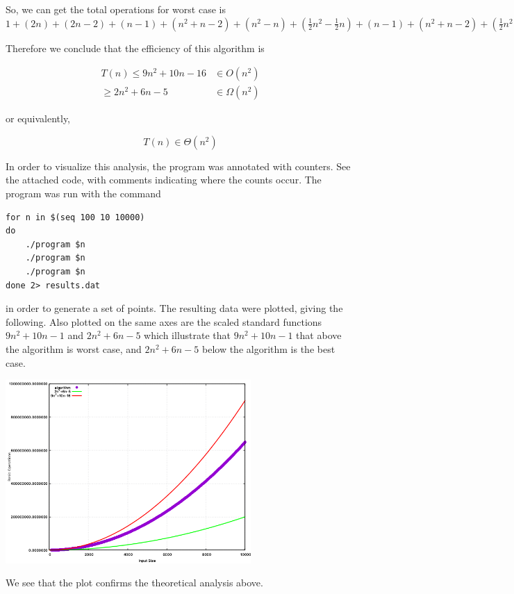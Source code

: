 \documentclass[11pt]{article}
\begin{document}
So, we can get the total operations for worst case is 
     $1  
      + (2n) 
      + (2n - 2) 
      + (n - 1) 
      + (n^{2} + n - 2) 
      + (n^{2} - n) 
      + (\frac{1}{2}n^{2} - \frac{1}{2}n) 
      + (n - 1) 
      + (n^{2} + n - 2) 
      + (\frac{1}{2}n^{2} - \frac{1}{2}n) 
      + (2n -2) 
      + (\frac{1}{2}n^{2} + \frac{1}{2}n - 1)
      + (\frac{1}{2}n^{2} - \frac{1}{2}n)
      + (n^{2} + n - 2)
      + (n^{2} - n)
      + (\frac{1}{2}n^{2} - \frac{1}{2}n) 
      + (n^{2} + n - 2)
      + (\frac{1}{2}n^{2} - \frac{1}{2}n)
      + (2n -2) = 9n^{2} + 10n - 16$

Therefore we conclude that the efficiency of this algorithm is

\begin{align*}
  T(n) \leq 9n^{2} + 10n - 16 &\in O(n^{2})\\
       \geq 2n^{2} + 6n - 5 &\in \Omega(n^{2})
\end{align*}

or equivalently,

\[
T(n) \in \Theta(n^2)
\]

In order to visualize this analysis, the program was annotated with
counters.  See the attached code, with comments indicating where the
counts occur.  The program was run with the command

\begin{Verbatim}
for n in $(seq 100 10 10000)
do
    ./program $n
    ./program $n
    ./program $n
done 2> results.dat
\end{Verbatim}

in order to generate a set of points.  The resulting data were
plotted, giving the following.  Also plotted on the same axes are the
scaled standard functions $9n^{2} + 10n - 1$ and $2n^{2} + 6n - 5$ 
which illustrate that $9n^{2} + 10n - 1$ that above the algorithm is 
worst case, and $2n^{2} + 6n - 5$ below the algorithm is the best 
case.

\begin{center}
  \includegraphics[width=0.7\textwidth]{analysis}
\end{center} 

We see that the plot confirms the theoretical analysis above.
\end{document}
